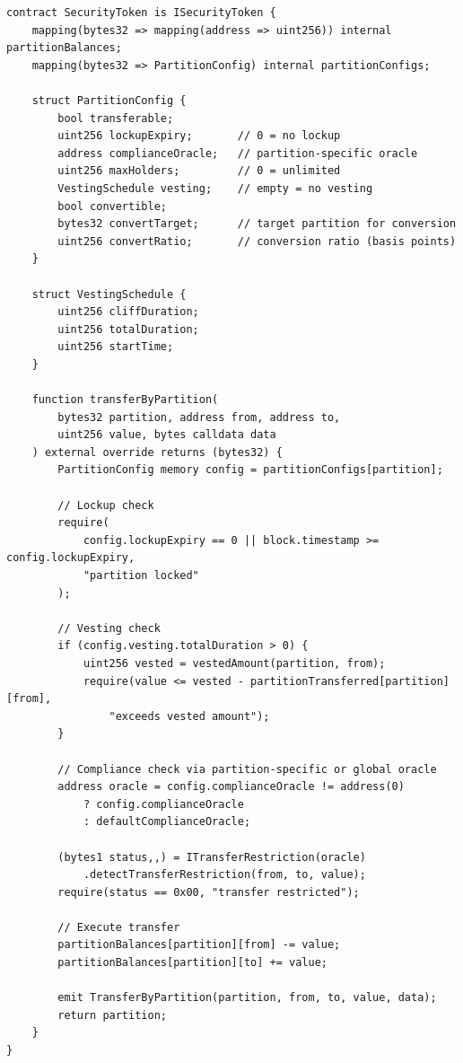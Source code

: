 \documentclass[11pt,a4paper]{article}
\begin{document}
\begin{lstlisting}[language=Solidity,caption={Partition management operations.}]
contract SecurityToken is ISecurityToken {
    mapping(bytes32 => mapping(address => uint256)) internal partitionBalances;
    mapping(bytes32 => PartitionConfig) internal partitionConfigs;

    struct PartitionConfig {
        bool transferable;
        uint256 lockupExpiry;       // 0 = no lockup
        address complianceOracle;   // partition-specific oracle
        uint256 maxHolders;         // 0 = unlimited
        VestingSchedule vesting;    // empty = no vesting
        bool convertible;
        bytes32 convertTarget;      // target partition for conversion
        uint256 convertRatio;       // conversion ratio (basis points)
    }

    struct VestingSchedule {
        uint256 cliffDuration;
        uint256 totalDuration;
        uint256 startTime;
    }

    function transferByPartition(
        bytes32 partition, address from, address to,
        uint256 value, bytes calldata data
    ) external override returns (bytes32) {
        PartitionConfig memory config = partitionConfigs[partition];

        // Lockup check
        require(
            config.lockupExpiry == 0 || block.timestamp >= config.lockupExpiry,
            "partition locked"
        );

        // Vesting check
        if (config.vesting.totalDuration > 0) {
            uint256 vested = vestedAmount(partition, from);
            require(value <= vested - partitionTransferred[partition][from],
                "exceeds vested amount");
        }

        // Compliance check via partition-specific or global oracle
        address oracle = config.complianceOracle != address(0)
            ? config.complianceOracle
            : defaultComplianceOracle;

        (bytes1 status,,) = ITransferRestriction(oracle)
            .detectTransferRestriction(from, to, value);
        require(status == 0x00, "transfer restricted");

        // Execute transfer
        partitionBalances[partition][from] -= value;
        partitionBalances[partition][to] += value;

        emit TransferByPartition(partition, from, to, value, data);
        return partition;
    }
}
\end{lstlisting}
\end{document}
